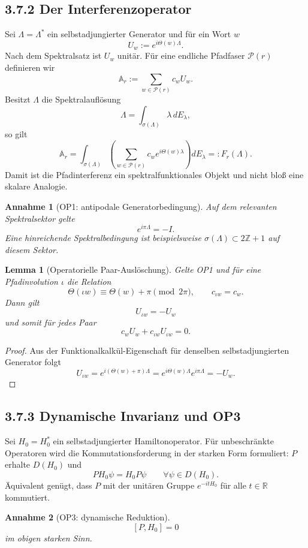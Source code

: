 \documentclass[11pt,a4paper]{article}
\newtheorem{lemma}{Lemma}
\newtheorem{annahme}{Annahme}
\begin{document}
\subsection*{3.7.2 Der Interferenzoperator}
Sei $\Lambda=\Lambda^*$ ein selbstadjungierter Generator und für ein Wort $w$
\[
U_w:=e^{i\Theta(w)\Lambda}.
\]
Nach dem Spektralsatz ist $U_w$ unitär. Für eine endliche Pfadfaser $\mathcal P(r)$ definieren wir
\[
\boxed{\mathbb A_r:=\sum_{w\in\mathcal P(r)} c_w U_w.}
\]
Besitzt $\Lambda$ die Spektralauflösung
\[
\Lambda=\int_{\sigma(\Lambda)}\lambda\,dE_\lambda,
\]
so gilt
\[
\mathbb A_r
=
\int_{\sigma(\Lambda)}
\left(\sum_{w\in\mathcal P(r)}c_w e^{i\Theta(w)\lambda}\right)dE_\lambda
=:F_r(\Lambda).
\]
Damit ist die Pfadinterferenz ein spektralfunktionales Objekt und nicht bloß eine skalare Analogie.

\begin{annahme}[OP1: antipodale Generatorbedingung]
Auf dem relevanten Spektralsektor gelte
\[
\boxed{e^{i\pi\Lambda}=-I.}
\]
Eine hinreichende Spektralbedingung ist beispielsweise $\sigma(\Lambda)\subset 2\mathbb Z+1$ auf diesem Sektor.
\end{annahme}

\begin{lemma}[Operatorielle Paar-Auslöschung]
Gelte OP1 und für eine Pfadinvolution $\iota$ die Relation
\[
\Theta(\iota w)\equiv\Theta(w)+\pi\pmod{2\pi},
\qquad c_{\iota w}=c_w.
\]
Dann gilt
\[
U_{\iota w}=-U_w
\]
und somit für jedes Paar
\[
c_wU_w+c_{\iota w}U_{\iota w}=0.
\]
\end{lemma}

\begin{proof}
Aus der Funktionalkalkül-Eigenschaft für denselben selbstadjungierten Generator folgt
\[
U_{\iota w}
=e^{i(\Theta(w)+\pi)\Lambda}
=e^{i\Theta(w)\Lambda}e^{i\pi\Lambda}
=-U_w.
\]
\end{proof}

\subsection*{3.7.3 Dynamische Invarianz und OP3}
Sei $H_0=H_0^*$ ein selbstadjungierter Hamiltonoperator. Für unbeschränkte Operatoren wird die Kommutationsforderung in der starken Form formuliert: $P$ erhalte $D(H_0)$ und
\[
PH_0\psi=H_0P\psi\qquad\forall\psi\in D(H_0).
\]
Äquivalent genügt, dass $P$ mit der unitären Gruppe $e^{-itH_0}$ für alle $t\in\mathbb R$ kommutiert.

\begin{annahme}[OP3: dynamische Reduktion]
\[
\boxed{[P,H_0]=0}
\]
im obigen starken Sinn.
\end{annahme}
\end{document}
